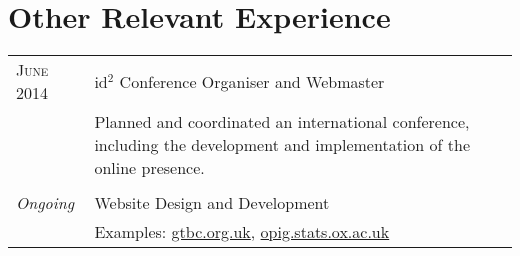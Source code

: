 \section{Other Relevant Experience}
\begin{tabular}{>{\raggedleft}p{2.15cm}|p{12cm}}

\textsc{June 2014} &  id$^2$ Conference Organiser and Webmaster \\
 & Planned and coordinated an international conference, including the development and implementation of the online presence. \\

\multicolumn{2}{c}{}\\

\emph{Ongoing} &  Website Design and Development \\
 &  Examples: \url{gtbc.org.uk}, \url{opig.stats.ox.ac.uk}\\

\end{tabular}
